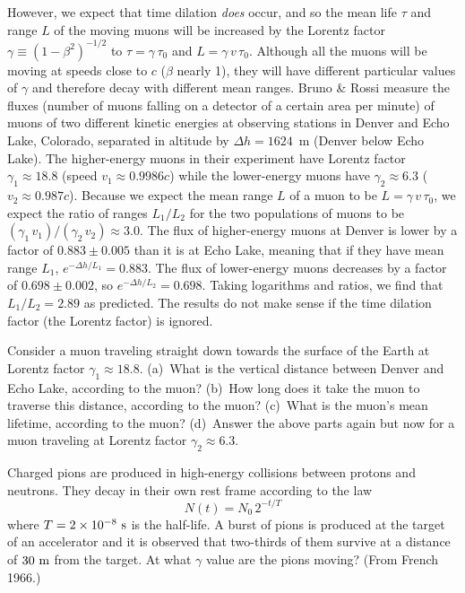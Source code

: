 However, we expect that time dilation {\em does\/} occur, and so the
mean life $\tau$ and range $L$ of the moving muons will be increased
by the Lorentz factor $\gamma\equiv(1-\beta^2)^{-1/2}$ to
$\tau=\gamma\,\tau_0$ and $L=\gamma\,v\,\tau_0$.  Although all the
muons will be moving at speeds close to $c$ ($\beta$ nearly 1), they
will have different particular values of $\gamma$ and therefore decay
with different mean ranges.  Bruno \& Rossi measure the fluxes (number
of muons falling on a detector of a certain area per minute) of muons
of two different kinetic energies at observing stations in Denver and
Echo Lake, Colorado, separated in altitude by $\Delta h=1624$~m
(Denver below Echo Lake).  The higher-energy muons in their experiment
have Lorentz factor $\gamma_1\approx 18.8$ (speed $v_1\approx
0.9986c$) while the lower-energy muons have $\gamma_2\approx 6.3$
($v_2\approx 0.987c$).  Because we expect the mean range $L$ of a muon
to be $L=\gamma\,v\,\tau_0$, we expect the ratio of ranges $L_1/L_2$
for the two populations of muons to be $(\gamma_1\, v_1)/(\gamma_2\,
v_2)\approx 3.0$.  The flux of higher-energy muons at Denver is lower
by a factor of $0.883\pm 0.005$ than it is at Echo Lake, meaning that
if they have mean range $L_1$, $e^{-\Delta h/L_1}=0.883$.  The flux of
lower-energy muons decreases by a factor of $0.698\pm 0.002$, so
$e^{-\Delta h/L_2}=0.698$.  Taking logarithms and ratios, we find that
$L_1/L_2=2.89$ as predicted.  The results do not make sense if the
time dilation factor (the Lorentz factor) is ignored.


\begin{problem}
Consider a muon traveling straight down towards the surface of the
Earth at Lorentz factor $\gamma_1\approx 18.8$.  (a)~What is the
vertical distance between Denver and Echo Lake, according to the muon?
(b)~How long does it take the muon to traverse this distance,
according to the muon?  (c)~What is the muon's mean lifetime,
according to the muon?  (d)~Answer the above parts again but now for
a muon traveling at Lorentz factor $\gamma_2\approx 6.3$.
\end{problem}

\begin{problem}
Charged pions are produced in high-energy collisions between protons
and neutrons.  They decay in their own rest frame according to the law
\begin{equation}
N(t) = N_0\,2^{-t/T}
\end{equation}
where $T=2\times 10^{-8}~{\rm s}$ is the half-life.  A burst of pions
is produced at the target of an accelerator and it is observed that
two-thirds of them survive at a distance of $30~{\rm m}$ from the
target.  At what $\gamma$ value are the pions moving?  (From French
1966.)
\end{problem}

